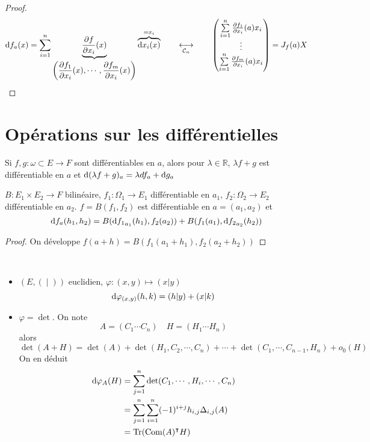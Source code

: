 \begin{proof}
    \[
        \mathrm{d} f_a(x)=\sum_{i=1}^n\underbrace{\frac{\partial f}{\partial x_i}(x)}_{\displaystyle \left(\frac{\partial f_1}{\partial x_i}(x), \cdots, \frac{\partial f_m}{\partial x_i}(x)\right)}\overbrace{\mathrm{d} x_i(x)}^{=x_i} \qquad \underset{\mathcal C_n}{\longleftrightarrow}\qquad \begin{pmatrix}
            \sum_{i=1}^n\limits \frac{\partial f_1}{\partial x_i}(a)x_i \\
            \vdots \\
            \sum_{i=1}^n\limits \frac{\partial f_m}{\partial x_i}(a)x_i
        \end{pmatrix}=J_f(a)X
    \]
\end{proof}

\section{Opérations sur les différentielles}

\begin{prop}
    Si $f,g:\omega\subset E\to F$ sont différentiables en $a$, alors pour $\lambda\in\mathbb R$, $\lambda f+g$ est différentiable en $a$ et $\mathrm{d} (\lambda f+g)_a=\lambda df_a+\mathrm{d} g_a$ 
\end{prop}

\begin{prop}
    \Hyp $B:E_1\times E_2\to F$ bilinéaire, $f_1:\Omega_1\to E_1$ différentiable en $a_1$, $f_2:\Omega_2\to E_2$ différentiable en $a_2$.
    \Conc $f=B(f_1, f_2)$ est différentiable en $a=(a_1, a_2)$ et \[\mathrm{d} f_a(h_1, h_2)=B(\mathrm{d} {f_1}_{a_1}(h_1), f_2(a_2))+B(f_1(a_1), \mathrm{d} {f_2}_{a_2}(h_2)) \]
\end{prop}

\begin{proof}
    On développe $f(a+h)=B(f_1(a_1+h_1), f_2(a_2+h_2))$
\end{proof}

\begin{ex} ~
    \begin{itemize}
        \item $(E, (\; |\; ))$ euclidien, $\varphi:(x, y)\longmapsto (x|y)$ \[
                \mathrm{d} \varphi_{(x, y)}(h, k)=(h|y)+(x|k)
            \]
        \item $\varphi = \det $. On note \[
                A = (C_1 \cdots C_n) \quad H=(H_1 \cdots H_n)
            \]
            alors \[
                \det(A+H)=\det(A)+\det(H_1, C_2, \cdots, C_n)+\cdots + \det(C_1, \cdots, C_{n-1}, H_n)+o_0(H)
            \]
            On en déduit \begin{align*}
                \mathrm{d} \varphi_A(H) &= \sum_{j=1}^n \det(C_1, \cdots, H_i, \cdots, C_n)\\
                                   &= \sum_{j=1}^n\sum_{i=1}^n(-1)^{i+j}h_{i, j}\Delta_{i, j}(A) \\
                                   &= \operatorname{Tr}(\operatorname{Com}(A)^\intercal H)
            \end{align*}
    \end{itemize}
\end{ex}

